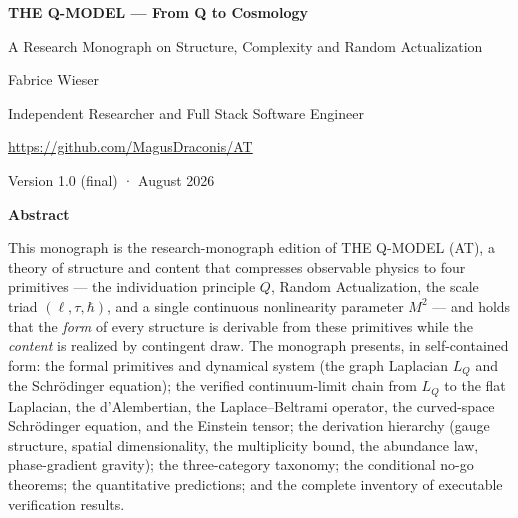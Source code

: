 \documentclass[10pt,twoside,openany]{book}
\begin{document}

\frontmatter

\begin{center}
{\LARGE\bfseries THE Q-MODEL — From Q to Cosmology\par}
\vspace{0.4em}
{\large A Research Monograph on Structure, Complexity and Random Actualization\par}
\vspace{1.0em}
{\normalsize Fabrice Wieser\par}
{\small Independent Researcher and Full Stack Software Engineer\par}
{\small \url{https://github.com/MagusDraconis/AT}\par}
\vspace{0.5em}
{\normalsize Version 1.0 (final) \quad· August 2026\par}
\end{center}

\vspace{0.8em}

{\centering\Large\bfseries Abstract\par}
\vspace{0.3em}
\noindent
This monograph is the research-monograph edition of THE Q-MODEL (AT), a theory of
structure and content that compresses observable physics to four primitives — the
individuation principle $Q$, Random Actualization, the scale triad $(\ell,\tau,\hbar)$,
and a single continuous nonlinearity parameter $M^2$ — and holds that the \emph{form} of
every structure is derivable from these primitives while the \emph{content} is realized by
contingent draw. The monograph presents, in self-contained form: the formal primitives and
dynamical system (the graph Laplacian $L_Q$ and the Schr\"odinger equation); the verified
continuum-limit chain from $L_Q$ to the flat Laplacian, the d'Alembertian, the
Laplace--Beltrami operator, the curved-space Schr\"odinger equation, and the Einstein
tensor; the derivation hierarchy (gauge structure, spatial dimensionality, the
multiplicity bound, the abundance law, phase-gradient gravity); the three-category
taxonomy; the conditional no-go theorems; the quantitative predictions; and the complete
inventory of executable verification results.
\end{document}
